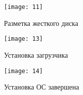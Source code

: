 \begin{figure}[ht]
    \centering
	\texttt{[image: 11]}
	\caption{Разметка жесткого диска}
\end{figure}

\begin{figure}[ht]
    \centering
	\texttt{[image: 13]}
	\caption{Установка загрузчика}
\end{figure}

\begin{figure}[ht]
    \centering
	\texttt{[image: 14]}
	\caption{Установка ОС завершена}
\end{figure}
